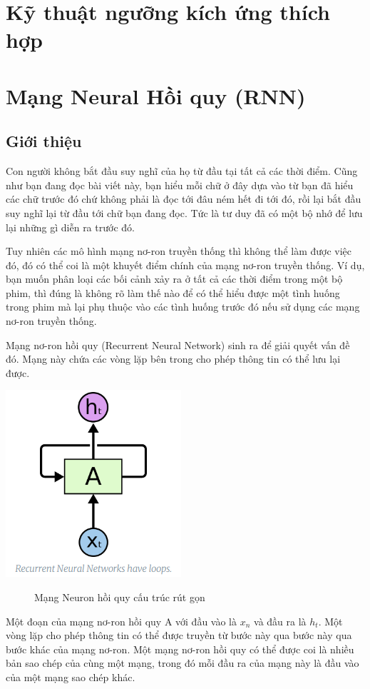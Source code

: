 \section{Kỹ thuật ngưỡng kích ứng thích hợp}

\section{Mạng Neural Hồi quy (RNN)}
\subsection{Giới thiệu}
Con người không bắt đầu suy nghĩ của họ từ đầu tại tất cả các thời điểm. Cũng như bạn đang đọc bài viết này, bạn hiểu mỗi chữ ở đây dựa vào từ bạn đã hiểu các chữ trước đó chứ không phải là đọc tới đâu ném hết đi tới đó, rồi lại bắt đầu suy nghĩ lại từ đầu tới chữ bạn đang đọc. Tức là tư duy đã có một bộ nhớ để lưu lại những gì diễn ra trước đó.

Tuy nhiên các mô hình mạng nơ-ron truyền thống thì không thể làm được việc đó, đó có thể coi là một khuyết điểm chính của mạng nơ-ron truyền thống. Ví dụ, bạn muốn phân loại các bối cảnh xảy ra ở tất cả các thời điểm trong một bộ phim, thì đúng là không rõ làm thế nào để có thể hiểu được một tình huống trong phim mà lại phụ thuộc vào các tình huống trước đó nếu sử dụng các mạng nơ-ron truyền thống.

Mạng nơ-ron hồi quy (Recurrent Neural Network) sinh ra để giải quyết vấn đề đó. Mạng này chứa các vòng lặp bên trong cho phép thông tin có thể lưu lại được. \cite{rnn-basic}
\begin{center}
    \includegraphics[scale=.5]{image/chapter6/RNN-node.png}
    \begin{figure}[htp]
    \begin{center}
    \end{center}
    \caption{Mạng Neuron hồi quy cấu trúc rút gọn}
    \end{figure}
\end{center}
Một đoạn của mạng nơ-ron hồi quy A với đầu vào là $x_{n}$ và đầu ra là $h_{t}$. Một vòng lặp cho phép thông tin có thể được truyền từ bước này qua bước này qua bước khác của mạng nơ-ron.
Một mạng nơ-ron hồi quy có thể được coi là nhiều bản sao chép của cùng một mạng, trong đó mỗi đầu ra của mạng này là đầu vào của một mạng sao chép khác.


